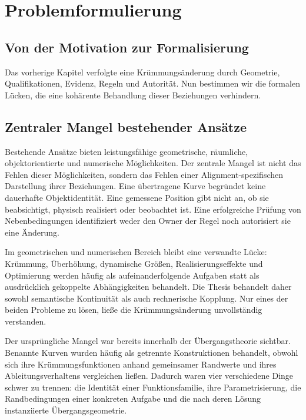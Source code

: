 
\chapter{Problemformulierung}

\section{Von der Motivation zur Formalisierung}

Das vorherige Kapitel verfolgte eine Krümmungsänderung durch Geometrie,
Qualifikationen, Evidenz, Regeln und Autorität. Nun bestimmen wir die formalen
Lücken, die eine kohärente Behandlung dieser Beziehungen verhindern.

\section{Zentraler Mangel bestehender Ansätze}

Bestehende Ansätze bieten leistungsfähige geometrische, räumliche,
objektorientierte und numerische Möglichkeiten. Der zentrale Mangel ist nicht
das Fehlen dieser Möglichkeiten, sondern das Fehlen einer
Alignment-spezifischen Darstellung ihrer Beziehungen. Eine übertragene Kurve
begründet keine dauerhafte Objektidentität. Eine gemessene Position gibt nicht
an, ob sie beabsichtigt, physisch realisiert oder beobachtet ist. Eine
erfolgreiche Prüfung von Nebenbedingungen identifiziert weder den Owner der
Regel noch autorisiert sie eine Änderung.

Im geometrischen und numerischen Bereich bleibt eine verwandte Lücke:
Krümmung, Überhöhung, dynamische Größen, Realisierungseffekte und Optimierung
werden häufig als aufeinanderfolgende Aufgaben statt als ausdrücklich
gekoppelte Abhängigkeiten behandelt. Die Thesis behandelt daher sowohl
semantische Kontinuität als auch rechnerische Kopplung. Nur eines der beiden
Probleme zu lösen, ließe die Krümmungsänderung unvollständig verstanden.

Der ursprüngliche Mangel war bereits innerhalb der Übergangstheorie sichtbar.
Benannte Kurven wurden häufig als getrennte Konstruktionen behandelt, obwohl
sich ihre Krümmungsfunktionen anhand gemeinsamer Randwerte und ihres
Ableitungsverhaltens vergleichen ließen. Dadurch waren vier verschiedene
Dinge schwer zu trennen: die Identität einer Funktionsfamilie, ihre
Parametrisierung, die Randbedingungen einer konkreten Aufgabe und die nach
deren Lösung instanziierte Übergangsgeometrie.

